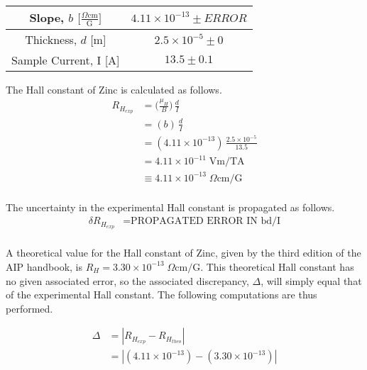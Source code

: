 \documentclass[a4paper]{article}
\begin{document}
\begin{center}
\begin{tabular}{|c|c|}
\hline
Slope, $b$ $\big[  \frac{\Omega \text{cm}}{\text{G}} \big] $ & $4.11 \times 10^{-13} \pm ERROR$ \topVspace \bottomVspace \\
\hline
Thickness, $d$ [m] & $2.5 \times 10^{-5} \pm 0$ \topVspace \bottomVspace \\
\hline
Sample Current, I [A] & $13.5 \pm 0.1$ \topVspace \bottomVspace \\
\hline
\end{tabular}
\label{table:zinc_RH}
\end{center}

The Hall constant of Zinc is calculated as follows.
\begin{align*}
R_{H_{exp}} &= \big( \frac{\mu_H}{B} \big) \, \frac{d}{I} \\
    &= (b) \, \frac{d}{I} \\
    &= (4.11 \times 10^{-13}) \, \frac{2.5 \times 10^{-5}}{13.5} \\
    &= 4.11 \times 10^{-11} \; \text{Vm/TA} \\
    &\equiv 4.11 \times 10^{-13} \; \Omega \text{cm/G} \\
\end{align*}

The uncertainty in the experimental Hall constant is propagated as follows.
\begin{align*}
\delta R_{H_{exp}} &= \text{PROPAGATED ERROR IN bd/I} \\
\end{align*}

A theoretical value for the Hall constant of Zinc, given by the third
edition of the AIP handbook, is $R_H = 3.30 \times 10^{-13} \; \Omega 
\text{cm/G}$. This theoretical Hall constant has no given associated error, so the associated discrepancy, $\Delta$, will simply equal that of the experimental Hall constant. The following computations are thus performed.

\begin{align*}
\Delta &= | R_{H_{exp}} - R_{H_{theo}} | \\
	   &= | (4.11 \times 10^{-13}) - (3.30 \times 10^{-13}) | \\
\end{align*}
\end{document}
